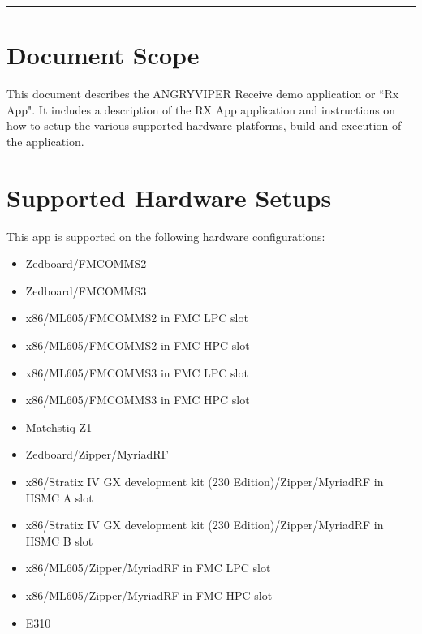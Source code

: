 \newpage
\tableofcontents
\pagebreak
\vspace{1pc}
\hrule
\section{Document Scope}
This document describes the ANGRYVIPER Receive demo application or ``Rx App". It includes a description of the RX App application and instructions on how to setup the various supported hardware platforms, build and execution of the application.

\section{Supported Hardware Setups}
This app is supported on the following hardware configurations:
\begin{itemize}
  \item Zedboard/FMCOMMS2
  \item Zedboard/FMCOMMS3
  \item x86/ML605/FMCOMMS2 in FMC LPC slot
  \item x86/ML605/FMCOMMS2 in FMC HPC slot
  \item x86/ML605/FMCOMMS3 in FMC LPC slot
  \item x86/ML605/FMCOMMS3 in FMC HPC slot
  \item Matchstiq-Z1
  \item Zedboard/Zipper/MyriadRF
  \item x86/Stratix IV GX development kit (230 Edition)/Zipper/MyriadRF in HSMC A slot
  \item x86/Stratix IV GX development kit (230 Edition)/Zipper/MyriadRF in HSMC B slot
  \item x86/ML605/Zipper/MyriadRF in FMC LPC slot
  \item x86/ML605/Zipper/MyriadRF in FMC HPC slot
  \item E310
\end{itemize}


